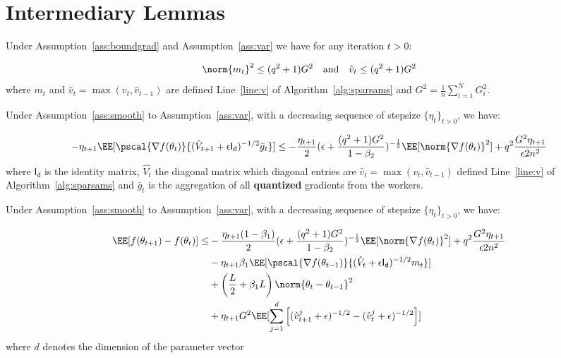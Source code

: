 \documentclass[11pt]{article}
\begin{document}
\newpage



\newpage
\appendix 


\section{Intermediary Lemmas}\label{app:interlemmas}

\begin{Lemma}\label{lem:bound}
Under Assumption~\ref{ass:boundgrad} and Assumption~\ref{ass:var} we have for any iteration $t >0$:

\begin{equation}
\norm{m_t}^2 \leq (q^2+1) G^2 \quad \textrm{and} \quad \hat v_t \leq (q^2+1) G^2
\end{equation}
where $m_t$ and $\hat v_t=\max(v_t,\hat v_{t-1})$ are defined Line~\ref{line:v} of Algorithm~\ref{alg:sparsams} and $G^2 = \frac{1}{n}\sum_{i=1}^N  G_{i}^2$.
\end{Lemma}


\begin{Lemma}\label{lem:lemma1}
Under Assumption~\ref{ass:smooth} to Assumption~\ref{ass:var}, with a decreasing sequence of stepsize $\{\eta_t\}_{t>0}$, we have:

\begin{equation}
-\eta_{t+1}\EE[\pscal{\nabla f(\theta_t)}{(\hat{V}_{t+1} + \epsilon \mathsf{I_d})^{-1/2} \bar{g}_t}] \leq - \frac{\eta_{t+1}}{2}  (\epsilon + \frac{(q^2+1)G^2}{1 - \beta_2})^{-\frac{1}{2}} \EE[\norm{\nabla f(\theta_t)}^2] +q^2 \frac{G^2 \eta_{t+1}}{\epsilon 2n^2}
\end{equation}
where $ \mathsf{I_d}$ is the identity matrix, $\hat{V_t}$ the diagonal matrix which diagonal entries are $\hat v_t=\max(v_t,\hat v_{t-1})$ defined Line~\ref{line:v} of Algorithm~\ref{alg:sparsams} and $\bar{g}_t$ is the aggregation of all \textbf{quantized} gradients from the workers.
\end{Lemma}

\begin{Lemma}\label{lem:lemma2}
Under Assumption~\ref{ass:smooth} to Assumption~\ref{ass:var}, with a decreasing sequence of stepsize $\{\eta_t\}_{t>0}$, we have:

\begin{equation}
\begin{split}
\EE[f(\theta_{t+1}) - f(\theta_{t}) ] \leq &   - \frac{\eta_{t+1}(1-\beta_1)}{2}  (\epsilon + \frac{(q^2+1)G^2}{1 - \beta_2})^{-\frac{1}{2}} \EE[\norm{\nabla f(\theta_t)}^2] +q^2 \frac{G^2 \eta_{t+1}}{\epsilon 2n^2} \\
&- \eta_{t+1} \beta_1\EE[\pscal{\nabla f(\theta_{t-1})}{(\hat{V}_{t} + \epsilon \mathsf{I_d})^{-1/2} m_{t}}]\\
& +  \left(\frac{L}{2} + \beta_1 L \right) \norm{\theta_t - \theta_{t-1}}^2\\
&+   \eta_{t+1} G^2 \EE[\sum_{j=1}^d \left[(\hat{v}^j_{t+1} + \epsilon )^{-1/2} - (\hat{v}^j_{t} + \epsilon )^{-1/2}  \right] ]
\end{split}
\end{equation}
where $d$ denotes the dimension of the parameter vector
\end{Lemma}
\end{document}
